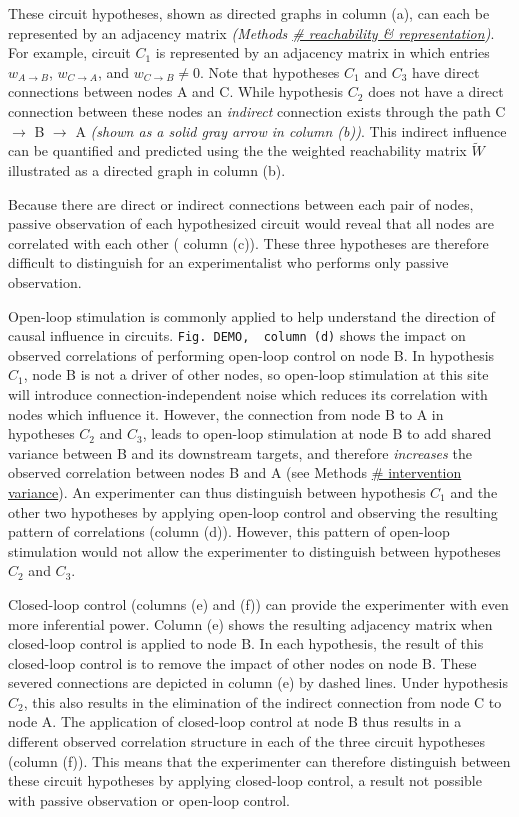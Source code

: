 \documentclass{article}
\begin{document}
These circuit hypotheses, shown as directed graphs in column (a), can each be represented by an adjacency matrix \emph{(Methods
\href{REF-SECTION-HERE}{\# reachability \& representation})}. For example, circuit \(C_1\) is represented by an adjacency matrix in which entries \(w_{A→B}\), \(w_{C→A}\), and \(w_{C→B} \neq 0\). Note that hypotheses \(C_1\) and \(C_3\) have direct connections between nodes A and C. While hypothesis \(C_2\) does not have a direct connection between these nodes an \emph{indirect} connection exists through the path C \(\to\) B \(\to\) A \emph{(shown as a solid gray arrow in column
(b))}. This indirect influence can be quantified and predicted using the the weighted reachability matrix \(\widetilde{W}\) illustrated as a directed graph in column (b).

Because there are direct or indirect connections between each pair of nodes, passive observation of each hypothesized circuit would reveal that all nodes are correlated with each other ( column (c)). These three hypotheses are therefore difficult to distinguish for an experimentalist who performs only passive observation.

Open-loop stimulation is commonly applied to help understand the direction of causal influence in circuits.
\texttt{Fig.\ DEMO,\ \ column\ (d)} shows the impact on observed correlations of performing open-loop control on node B. In hypothesis
\(C_1\), node B is not a driver of other nodes, so open-loop stimulation at this site will introduce connection-independent noise which reduces its correlation with nodes which influence it. However, the connection from node B to A in hypotheses \(C_2\) and \(C_3\), leads to open-loop stimulation at node B to add shared variance between B and its downstream targets, and therefore \emph{increases} the observed correlation between nodes B and A (see Methods
\href{REF-SECTION-HERE}{\# intervention variance}). An experimenter can thus distinguish between hypothesis \(C_1\) and the other two hypotheses by applying open-loop control and observing the resulting pattern of correlations (column (d)). However, this pattern of open-loop stimulation would not allow the experimenter to distinguish between hypotheses \(C_2\) and \(C_3\).

Closed-loop control (columns (e) and (f)) can provide the experimenter with even more inferential power. Column (e) shows the resulting adjacency matrix when closed-loop control is applied to node B. In each hypothesis, the result of this closed-loop control is to remove the impact of other nodes on node B. These severed connections are depicted in column (e) by dashed lines. Under hypothesis \(C_2\), this also results in the elimination of the indirect connection from node C to node A. The application of closed-loop control at node B thus results in a different observed correlation structure in each of the three circuit hypotheses (column (f)). This means that the experimenter can therefore distinguish between these circuit hypotheses by applying closed-loop control, a result not possible with passive observation or open-loop control.
\end{document}
